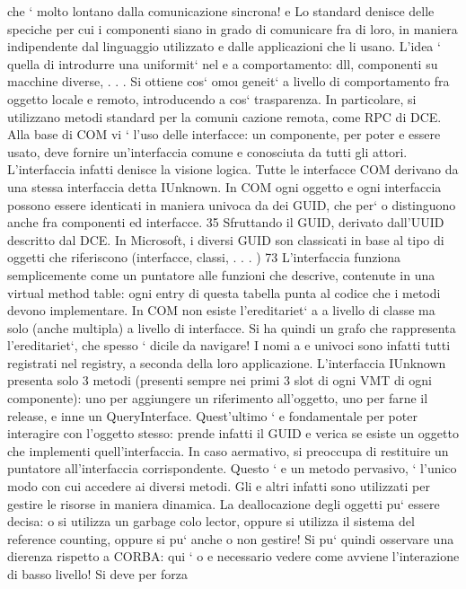 \documentclass[a4paper,12pt]{article}
\begin{document}
che ` molto lontano dalla comunicazione sincrona!
e
Lo standard denisce delle speciche per cui i componenti siano in grado
di comunicare fra di loro, in maniera indipendente dal linguaggio utilizzato e
dalle applicazioni che li usano. L'idea ` quella di introdurre una uniformit` nel
e
a
comportamento: dll, componenti su macchine diverse, . . . Si ottiene cos` omo\i{}
geneit` a livello di comportamento fra oggetto locale e remoto, introducendo
a
cos` trasparenza. In particolare, si utilizzano metodi standard per la comuni\i{}
cazione remota, come RPC di DCE.
Alla base di COM vi ` l'uso delle interfacce: un componente, per poter
e
essere usato, deve fornire un'interfaccia comune e conosciuta da tutti gli attori. L'interfaccia infatti denisce la
visione logica. Tutte le interfacce COM
derivano da una stessa interfaccia detta IUnknown. In COM ogni oggetto e ogni
interfaccia possono essere identicati in maniera univoca da dei GUID, che per`
o
distinguono anche fra componenti ed interfacce.
35 Sfruttando il GUID, derivato dall'UUID descritto dal DCE. In Microsoft, i diversi GUID
son classicati in base al tipo di oggetti che riferiscono (interfacce, classi, . . . )
73
L'interfaccia funziona semplicemente come un puntatore alle funzioni che descrive, contenute in una virtual method
table: ogni entry di questa tabella punta
al codice che i metodi devono implementare. In COM non esiste l'ereditariet`
a
a livello di classe ma solo (anche multipla) a livello di interfacce. Si ha quindi
un grafo che rappresenta l'ereditariet`, che spesso ` dicile da navigare! I nomi
a
e
univoci sono infatti tutti registrati nel registry, a seconda della loro applicazione.
L'interfaccia IUnknown presenta solo 3 metodi (presenti sempre nei primi
3 slot di ogni VMT di ogni componente): uno per aggiungere un riferimento
all'oggetto, uno per farne il release, e inne un QueryInterface. Quest'ultimo `
e
fondamentale per poter interagire con l'oggetto stesso: prende infatti il GUID e
verica se esiste un oggetto che implementi quell'interfaccia. In caso aermativo,
si preoccupa di restituire un puntatore all'interfaccia corrispondente. Questo `
e
un metodo pervasivo, ` l'unico modo con cui accedere ai diversi metodi. Gli
e
altri infatti sono utilizzati per gestire le risorse in maniera dinamica.
La deallocazione degli oggetti pu` essere decisa: o si utilizza un garbage colo
lector, oppure si utilizza il sistema del reference counting, oppure si pu` anche
o
non gestire! Si pu` quindi osservare una dierenza rispetto a CORBA: qui `
o
e
necessario vedere come avviene l'interazione di basso livello! Si deve per forza
\end{document}
